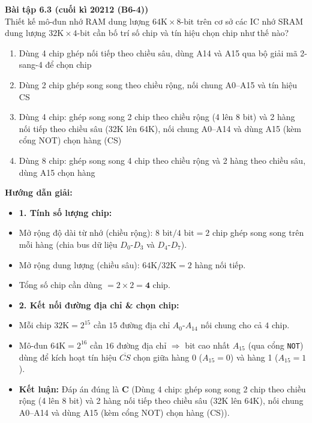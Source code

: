 \textbf{Bài tập 6.3 (cuối kì 20212 (B6-4))}\\
Thiết kế mô-đun nhớ RAM dung lượng $64\text{K} \times 8\text{-bit}$ trên cơ sở các IC nhớ SRAM dung lượng $32\text{K} \times 4\text{-bit}$ cần bố trí số chip và tín hiệu chọn chip như thế nào?
\begin{enumerate}[label=\Alph*.]
    \item Dùng 4 chip ghép nối tiếp theo chiều sâu, dùng A14 và A15 qua bộ giải mã 2-sang-4 để chọn chip
    \item Dùng 2 chip ghép song song theo chiều rộng, nối chung A0--A15 và tín hiệu CS
    \item Dùng 4 chip: ghép song song 2 chip theo chiều rộng (4 lên 8 bit) và 2 hàng nối tiếp theo chiều sâu (32K lên 64K), nối chung A0--A14 và dùng A15 (kèm cổng NOT) chọn hàng (CS)
    \item Dùng 8 chip: ghép song song 4 chip theo chiều rộng và 2 hàng theo chiều sâu, dùng A15 chọn hàng
\end{enumerate}
\textbf{Hướng dẫn giải:}
\begin{itemize}
    \item \textbf{1. Tính số lượng chip:}
    \item Mở rộng độ dài từ nhớ (chiều rộng): $8\text{ bit} / 4\text{ bit} = 2$ chip ghép song song trên mỗi hàng (chia bus dữ liệu $D_0\text{-}D_3$ và $D_4\text{-}D_7$).
    \item Mở rộng dung lượng (chiều sâu): $64\text{K} / 32\text{K} = 2$ hàng nối tiếp.
    \item Tổng số chip cần dùng $= 2 \times 2 = \mathbf{4}$ chip.
    \item \textbf{2. Kết nối đường địa chỉ \& chọn chip:}
    \item Mỗi chip $32\text{K} = 2^{15}$ cần $15$ đường địa chỉ $A_0\text{-}A_{14}$ nối chung cho cả $4$ chip.
    \item Mô-đun $64\text{K} = 2^{16}$ cần $16$ đường địa chỉ $\Rightarrow$ bit cao nhất $A_{15}$ (qua cổng \texttt{NOT}) dùng để kích hoạt tín hiệu $\overline{CS}$ chọn giữa hàng 0 ($A_{15}=0$) và hàng 1 ($A_{15}=1$).
    \item \textbf{Kết luận:} Đáp án đúng là \textbf{C} (Dùng 4 chip: ghép song song 2 chip theo chiều rộng (4 lên 8 bit) và 2 hàng nối tiếp theo chiều sâu (32K lên 64K), nối chung A0--A14 và dùng A15 (kèm cổng NOT) chọn hàng (CS)).
\end{itemize}

